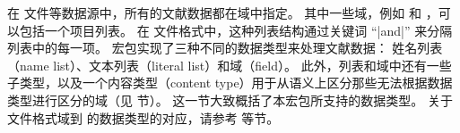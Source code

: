 
在  文件等数据源中，所有的文献数据都在域中指定。
其中一些域，例如  和 ，可以包括一个项目列表。
在 \BibTeX 文件格式中，这种列表结构通过关键词 “|and|” 来分隔列表中的每一项。
\biblatex 宏包实现了三种不同的数据类型来处理文献数据：
姓名列表（name list）、文本列表（literal list）和域（field）。
此外，列表和域中还有一些子类型，以及一个内容类型（content type）用于从语义上区分那些无法根据数据类型进行区分的域（见  节）。
这一节大致概括了本宏包所支持的数据类型。
关于 \BibTeX 文件格式域到 \biblatex 的数据类型的对应，请参考  等节。

